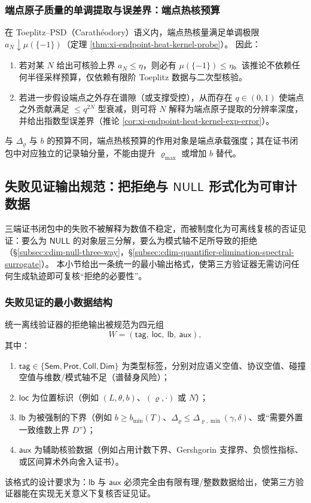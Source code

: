 \subsubsection{端点原子质量的单调提取与误差界：端点热核预算}\label{subsubsec:cdim-blindspot-budget-endpoint-atom}
在 Toeplitz--PSD（Carath\'eodory）语义内，端点热核量满足单调极限 \(a_N\downarrow\mu(\{-1\})\)（定理 \ref{thm:xi-endpoint-heat-kernel-probe}）。
因此：
\begin{enumerate}
  \item 若对某 \(N\) 给出可核验上界 \(a_N\le \eta\)，则必有 \(\mu(\{-1\})\le \eta\)。该推论不依赖任何半径采样预算，仅依赖有限阶 Toeplitz 数据与二次型核验。
  \item 若进一步假设端点之外存在谱隙（或支撑受控），从而存在 \(q\in(0,1)\) 使端点之外贡献满足 \(\le q^{2N}\) 型衰减，则可将 \(N\) 解释为端点原子提取的分辨率深度，并给出指数型误差界（推论 \ref{cor:xi-endpoint-heat-kernel-exp-error}）。
\end{enumerate}
与 \(\Delta_{\varrho}\) 与 \(b\) 的预算不同，端点热核预算的作用对象是端点承载强度；其在证书闭包中对应独立的记录轴分量，不能由提升 \(\varrho_{\max}\) 或增加 \(b\) 替代。

\subsection{失败见证输出规范：把拒绝与 \texorpdfstring{$\mathsf{NULL}$}{NULL} 形式化为可审计数据}\label{subsec:cdim-failure-witness-output-format}
三端证书闭包中的失败不被解释为数值不稳定，而被制度化为可离线复核的否证见证：要么为 \(\mathsf{NULL}\) 的对象层三分解，要么为模式轴不足所导致的拒绝（\S\ref{subsec:cdim-null-three-way}，\S\ref{subsec:cdim-quantifier-elimination-spectral-surrogate}）。
本小节给出一条统一的最小输出格式，使第三方验证器无需访问任何生成轨迹即可复核“拒绝的必要性”。

\subsubsection{失败见证的最小数据结构}\label{subsubsec:cdim-failure-witness-min-structure}
统一离线验证器的拒绝输出被规范为四元组
\[
W=(\mathsf{tag},\ \mathsf{loc},\ \mathsf{lb},\ \mathsf{aux}),
\]
其中：
\begin{enumerate}
  \item \(\mathsf{tag}\in\{\mathsf{Sem},\mathsf{Prot},\mathsf{Coll},\mathsf{Dim}\}\) 为类型标签，分别对应语义空值、协议空值、碰撞空值与维数/模式轴不足（谱替身风险）；
  \item \(\mathsf{loc}\) 为位置标识（例如 \((L,\theta,b)\)、\((\varrho,\cdot)\) 或 \(N\)）；
  \item \(\mathsf{lb}\) 为被强制的下界（例如 \(b\ge b_{\min}(T)\)、\(\Delta_{\varrho}\le \Delta_{\varrho,\min}(\gamma,\delta)\)、或“需要外置一致维数上界 \(D\)”）；
  \item \(\mathsf{aux}\) 为辅助核验数据（例如占用计数下界、Gershgorin 支撑界、负惯性指标、或区间算术外向舍入证书）。
\end{enumerate}
该格式的设计要求为：\(\mathsf{lb}\) 与 \(\mathsf{aux}\) 必须完全由有限有理/整数数据给出，使第三方验证器能在实现无关意义下复核否证见证。

